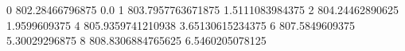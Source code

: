 0 802.28466796875 0.0
1 803.7957763671875 1.5111083984375
2 804.24462890625 1.9599609375
4 805.9359741210938 3.65130615234375
6 807.5849609375 5.30029296875
8 808.8306884765625 6.5460205078125
